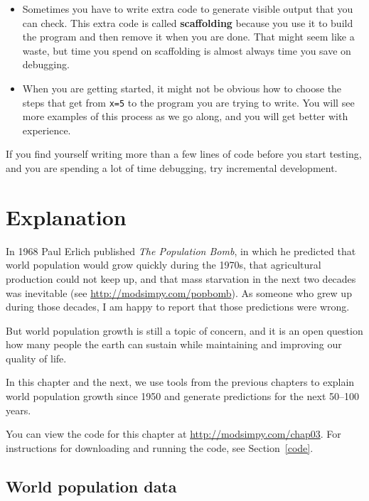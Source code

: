 \documentclass[12pt]{book}
\theoremstyle{exercise}
\begin{document}
\begin{itemize}

\item Sometimes you have to write extra code to generate visible output that you can check.  This extra code is called {\bf scaffolding} because you use it to build the program and then remove it when you are done.  That might seem like a waste, but time you spend on scaffolding is almost always time you save on debugging.

\item When you are getting started, it might not be obvious how to
choose the steps that get from {\tt x=5} to the program you are trying
to write.  You will see more examples of this process as we go along, and you will get better with experience.

\end{itemize}

If you find yourself writing more than a few lines of code before you start testing, and you are spending a lot of time debugging, try incremental development.


\chapter{Explanation}

In 1968 Paul Erlich published {\it The Population Bomb}, in which he predicted that world population would grow quickly during the 1970s, that agricultural production could not keep up, and that mass starvation in the next two decades was inevitable (see \url{http://modsimpy.com/popbomb}).  As someone who grew up during those decades, I am happy to report that those predictions were wrong.  

But world population growth is still a topic of concern, and it is an open question how many people the earth can sustain while maintaining and improving our quality of life.

In this chapter and the next, we use tools from the previous chapters to explain world population growth since 1950 and generate predictions for the next 50--100 years.

You can view the code for this chapter at \url{http://modsimpy.com/chap03}.  For instructions for downloading and running the code, see Section~\ref{code}.


\section{World population data}
\label{worldpopdata}
\end{document}
